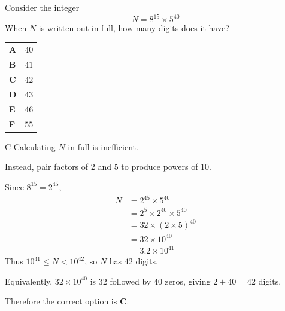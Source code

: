 \documentclass[11pt,a4paper]{article}
\begin{document}
\begin{enumerate}[label=\textbf{\arabic*.},leftmargin=*,itemsep=0pt,start=7]
\questionitem[Number]
Consider the integer
\[N = 8^{15}\times 5^{40}\]
When $N$ is written out in full, how many digits does it have?

\par\vspace*{12pt}
\begin{tabularx}{\linewidth}{@{}>{\bfseries}l Y@{}}
A &
$40$
\\[0.8em]
B &
$41$
\\[0.8em]
C &
$42$
\\[0.8em]
D &
$43$
\\[0.8em]
E &
$46$
\\[0.8em]
F &
$55$
\\
\end{tabularx}

\begin{djsSolution}{C}
Calculating $N$ in full is inefficient. 

Instead, pair factors of $2$ and $5$ to produce powers of $10$.

Since $8^{15}=2^{45}$,
\begin{align*}
N&=2^{45}\times 5^{40}\\[5pt]
 &=2^5\times 2^{40}\times 5^{40}\\[5pt]
 &=32 \times (2\times 5)^{40}\\[5pt]
 &=32\times 10^{40}\\[5pt]
 &=3.2\times 10^{41}
\end{align*}
Thus $10^{41}\leq N<10^{42}$, so $N$ has $42$ digits. 

Equivalently, $32\times10^{40}$ is $32$ followed by $40$ zeros, giving $2+40=42$ digits.

Therefore the correct option is \textbf{C}.
\end{djsSolution}
\end{enumerate}
\clearpage
\thispagestyle{djssolutions}
\vspace*{8pt}
\end{document}
